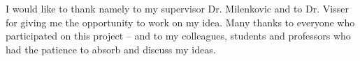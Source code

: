 \begin{dissacknowledgments}
\vspace{-0.4in} 
I would like to thank namely to my supervisor Dr. Milenkovic and to Dr. Visser for giving me the opportunity to work on my idea. Many thanks to everyone who participated on this project -- and to my colleagues, students and professors who had the patience to absorb and discuss my ideas.
\vspace{-0.3in}
\end{dissacknowledgments}

